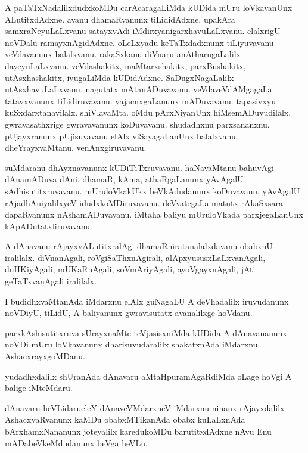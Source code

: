 \begin{mng}
A paTaTxNadalilxdudxkoMDu carAcaragaLiMda kUDida mUru loVkavanUnx ALutitxdAdxne. avanu dhamaRvanunx tiLididAdxne. upakAra samxraNeyuLaLxvanu satayxvAdi iMdirxyanigarxhavuLaLxvanu. elalxrigU noVDalu ramayxnAgidAdxne. oLeLxyadu keTaTxdadxnunx tiLiyuvavanu veVdavanunx balalxvanu. rakaSxkanu diVnaru anAtharugaLalilx dayeyuLaLxvanu. veVdashakitx, maMtarxshakitx, parxBushakitx, utAsxhashakitx, ivugaLiMda kUDidAdxne. SaDugxNagaLalilx utAsxhavuLaLxvanu. nagutatx mAtanADuvavanu. veVdaveVdAMgagaLa tatavxvanunx tiLidiruvavanu. yajacnxgaLanunx mADuvavanu. tapasivxyu kuSxdarxtanavilalx. shiVlavaMta. oMdu pArxNiyanUnx hiMsemADuvudilalx. gwravasathxrige gwravavanunx koDuvavanu. shudadhxnu parxsananxnu. pUjayxranunx pUjisuvavanu elAlx viSayagaLanUnx balalxvanu. dheYrayxvaMtanu. venAnxgiruvavanu.
\end{mng}

\begin{mng}
suMdaranu dhAyxnavanunx kUDiTiTxruvavanu. haNavaMtanu bahuvAgi dAnamADuva dAni. dhamaR, kAma, athaRgaLanunx yAvAgalU sAdhisutitxruvavanu. mUruloVkakUkx beVkAdudanunx koDuvavanu. yAvAgalU rAjadhAniyalilxyeV idudxkoMDiruvavanu. deVvategaLa matutx rAkaSxsara dapaRvanunx nAshamADuvavanu. iMtaha baliyu mUruloVkada parxjegaLanUnx kApADutatxliruvavanu.
\end{mng}

\begin{mng}
A dAnavanu rAjayxvALutitxralAgi dhamaRniratanalalxdavanu obabxnU iralilalx. diVnanAgali, roVgiSaThxnAgirali, alApxyususxLaLxvanAgali, duHKiyAgali, mUKaRnAgali, soVmAriyAgali, ayoVgayxnAgali, jAti geTaTxvanAgali iralilalx.
\end{mng}

\begin{mng}
I budidhxvaMtanAda iMdarxnu elAlx guNagaLU A deVhadalilx iruvudanunx noVDiyU, tiLidU, A baliyanunx gwravisutatx avanalilxge hoVdanu.
\end{mng}

\begin{mng}
parxkAshisutitxruva sUrayxnaMte teVjasisxniMda kUDida A dAnavananunx noVDi mUru loVkavanunx dharisuvudaralilx shakatxnAda iMdarxnu AshacxrayxgoMDanu.
\end{mng}

\begin{mng}
yudadhxdalilx shUranAda dAnavaru aMtaHpuramAgaRdiMda oLage hoVgi A balige iMteMdaru.
\end{mng}

\begin{mng}
dAnavaru heVLidaru\mdash eleY dAnaveVMdarxneV iMdarxnu ninanx rAjayxdalilx AshacxyaRvanunx kaMDu obabxMTikanAda obabx kuLaLxnAda bArxhamxNananunx joteyalilx karedukoMDu barutitxdAdxne nAvu Enu mADabeVkeMdudanunx beVga heVLu.
\end{mng}

